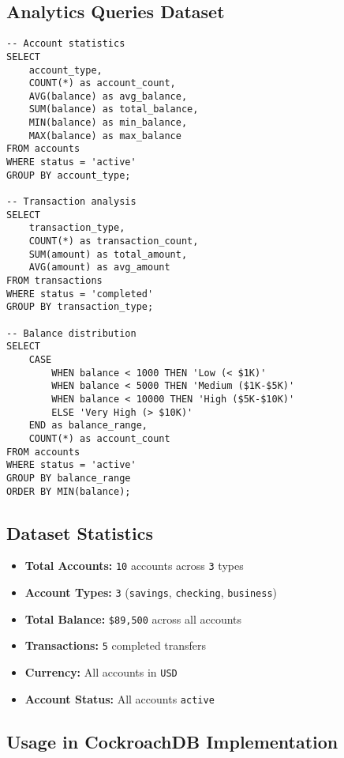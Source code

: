 \subsection{Analytics Queries Dataset}

\begin{verbatim}
-- Account statistics
SELECT
    account_type,
    COUNT(*) as account_count,
    AVG(balance) as avg_balance,
    SUM(balance) as total_balance,
    MIN(balance) as min_balance,
    MAX(balance) as max_balance
FROM accounts
WHERE status = 'active'
GROUP BY account_type;

-- Transaction analysis
SELECT
    transaction_type,
    COUNT(*) as transaction_count,
    SUM(amount) as total_amount,
    AVG(amount) as avg_amount
FROM transactions
WHERE status = 'completed'
GROUP BY transaction_type;

-- Balance distribution
SELECT
    CASE
        WHEN balance < 1000 THEN 'Low (< $1K)'
        WHEN balance < 5000 THEN 'Medium ($1K-$5K)'
        WHEN balance < 10000 THEN 'High ($5K-$10K)'
        ELSE 'Very High (> $10K)'
    END as balance_range,
    COUNT(*) as account_count
FROM accounts
WHERE status = 'active'
GROUP BY balance_range
ORDER BY MIN(balance);
\end{verbatim}

\subsection{Dataset Statistics}

\begin{itemize}
    \item \textbf{Total Accounts:} \texttt{10} accounts across \texttt{3} types
    \item \textbf{Account Types:} \texttt{3} (\texttt{savings}, \texttt{checking}, \texttt{business})
    \item \textbf{Total Balance:} \texttt{\$89,500} across all accounts
    \item \textbf{Transactions:} \texttt{5} completed transfers
    \item \textbf{Currency:} All accounts in \texttt{USD}
    \item \textbf{Account Status:} All accounts \texttt{active}
\end{itemize}

\subsection{Usage in CockroachDB Implementation}

